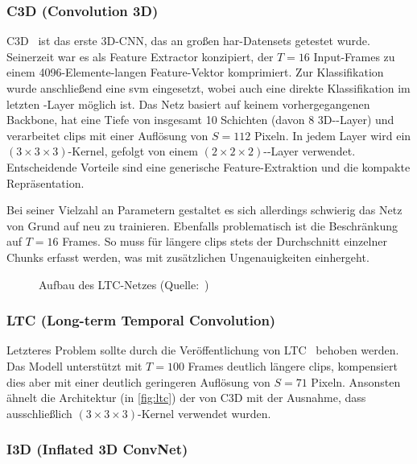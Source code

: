 \subsubsection*{C3D (Convolution 3D)}

C3D~\cite{Tran15} ist das erste 3D-CNN, das an großen \gls{har}-Datensets getestet wurde.
Seinerzeit war es als Feature Extractor konzipiert, der $T=16$ Input-Frames zu einem 4096-Elemente-langen Feature-Vektor komprimiert.
Zur Klassifikation wurde anschließend eine \gls{svm} eingesetzt, wobei auch eine direkte Klassifikation im letzten \fc-Layer möglich ist.
Das Netz basiert auf keinem vorhergegangenen Backbone, hat eine Tiefe von insgesamt 10 Schichten (davon 8 3D-\conv-Layer) und verarbeitet \glspl{clip} mit einer Auflösung von $S=112$ Pixeln.
In jedem Layer wird ein $(3 \times 3 \times 3)$-Kernel, gefolgt von einem $(2 \times 2 \times 2)$-\pool-Layer verwendet.
Entscheidende Vorteile sind eine generische Feature-Extraktion und die kompakte Repräsentation.

Bei seiner Vielzahl an Parametern gestaltet es sich allerdings schwierig das Netz von Grund auf neu zu trainieren.
Ebenfalls problematisch ist die Beschränkung auf $T=16$ Frames.
So muss für längere \glspl{clip} stets der Durchschnitt einzelner Chunks erfasst werden, was mit zusätzlichen Ungenauigkeiten einhergeht.

\begin{figure}[h!]
    \centering
    \caption[Aufbau des LTC-Netzes]{Aufbau des LTC-Netzes (Quelle:~\cite{Varol18})}
    \label{fig:ltc}
\end{figure}

\subsubsection*{LTC (Long-term Temporal Convolution)}

Letzteres Problem sollte durch die Veröffentlichung von LTC~\cite{Varol18} behoben werden.
Das Modell unterstützt mit $T=100$ Frames deutlich längere \glspl{clip}, kompensiert dies aber mit einer deutlich geringeren Auflösung von $S=71$ Pixeln.
Ansonsten ähnelt die Architektur (in \autoref{fig:ltc}) der von C3D mit der Ausnahme, dass ausschließlich $(3 \times 3 \times 3)$-Kernel verwendet wurden.

\subsubsection*{I3D (Inflated 3D ConvNet)}


